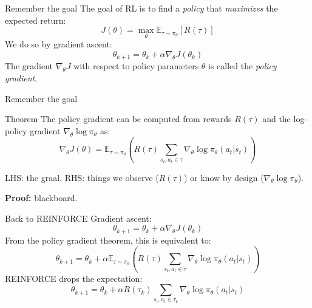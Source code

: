 \documentclass[10pt, aspectratio=1610]{beamer}
\begin{document}
\begin{frame}{Remember the goal}
    The goal of RL is to find a \emph{policy} that \emph{maximizes} the expected return:
    $$
    J(\theta) = \max_\theta \mathbb{E}_{\tau \sim \pi_\theta}[R(\tau)]
    $$
    We do so by gradient ascent:
    $$
    \theta_{k+1} = \theta_k + \alpha \nabla_\theta J(\theta_k)
    $$
    The gradient $\nabla_\theta J$ with respect to policy parameters $\theta$ is called the \emph{policy gradient}.
\end{frame}

\begin{frame}{Remember the goal}
    \begin{block}{Theorem}
        The policy gradient can be computed from rewards $R(\tau)$ and the log-policy gradient $\nabla_\theta \log \pi_\theta$ as:
        \begin{equation*}
            \nabla_\theta J(\theta) = \mathbb{E}_{\tau \sim \pi_\theta} \left(
            R(\tau)
            \sum_{s_t, a_t \in \tau} \nabla_\theta \log \pi_\theta(a_t | s_t)
            \right)
        \end{equation*}
    \end{block}
    LHS: the graal. RHS: things we observe ($R(\tau)$) or know by design ($\nabla_\theta \log \pi_\theta$).

    \textbf{Proof:} blackboard.
\end{frame}

\begin{frame}{Back to REINFORCE}
    Gradient ascent:
    $$
    \theta_{k+1} = \theta_k + \alpha \nabla_\theta J(\theta_k)
    $$
    From the policy gradient theorem, this is equivalent to:
    $$
    \theta_{k+1} = \theta_k + \alpha \mathbb{E}_{\tau \sim \pi_\theta} \left(
            R(\tau)
            \sum_{s_t, a_t \in \tau} \nabla_\theta \log \pi_\theta(a_t | s_t)
            \right)
    $$
    REINFORCE drops the expectation:
    $$
    \theta_{k+1} = \theta_k + \alpha R(\tau_k) \sum_{s_t, a_t \in \tau_k} \nabla_\theta \log \pi_\theta(a_t | s_t)
    $$
\end{frame}
\end{document}
